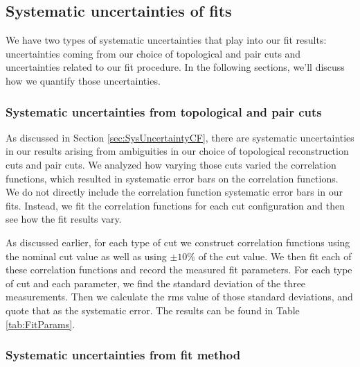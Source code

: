 \subsection{Systematic uncertainties of fits}
\label{sec:SysErrorsFits}

We have two types of systematic uncertainties that play into our fit results: uncertainties coming from our choice of topological and pair cuts and uncertainties related to our fit procedure.
In the following sections, we'll discuss how we quantify those uncertainties.


\subsubsection{Systematic uncertainties from topological and pair cuts}
\label{sec:SysErrorsFitsCuts}

As discussed in Section \ref{sec:SysUncertaintyCF}, there are systematic uncertainties in our results arising from ambiguities in our choice of topological reconstruction cuts and pair cuts.
We analyzed how varying those cuts varied the correlation functions, which resulted in systematic error bars on the correlation functions.
We do not directly include the correlation function systematic error bars in our fits.
Instead, we fit the correlation functions for each cut configuration and then see how the fit results vary.

As discussed earlier, for each type of cut we construct correlation functions using the nominal cut value as well as using $\pm10\%$ of the cut value.
We then fit each of these correlation functions and record the measured fit parameters.
For each type of cut and each parameter, we find the standard deviation of the three measurements.
Then we calculate the rms value of those standard deviations, and quote that as the systematic error.
The results can be found in Table \ref{tab:FitParams}.



\subsubsection{Systematic uncertainties from fit method}
\label{sec:SysErrorsFitsMethod}




